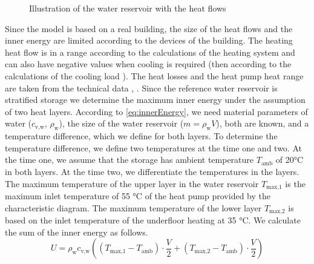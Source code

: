     \begin{figure}[H]
        \centering
        \def\svgwidth{120pt}
        
        \caption{Illustration of the water reservoir with the heat flows}
        \label{fig:Figure of the water reservoir with the heat flows}
    \end{figure}
    Since the model is based on a real building, the size of the heat flows and the inner energy are limited according to the devices of the building. The heating heat flow is in a range according to the calculations of the heating system \cite{Roth_Auslegung.2020} and can also have negative values when cooling is required (then according to the calculations of the cooling load \cite{SEFIngenieurgesellschaftMBH.2019}). The heat losses and the heat pump heat range are taken from the technical data \cite{Oskar}, \cite{TUM}.\newline
    Since the reference water reservoir is stratified storage we determine the maximum inner energy under the assumption of two heat layers. According to \autoref{eq:innerEnergy}, we need material parameters of water ($c_\text{v,w}$, $\rho_\text{w}$), the size of the water reservoir ($m = \rho_\text{w} V$), both are known, and a temperature difference, which we define for both layers. To determine the temperature difference, we define two temperatures at the time one and two. At the time one, we assume that the storage has ambient temperature $T_\text{amb}$ of 20°C in both layers. At the time two, we differentiate the temperatures in the layers. The maximum temperature of the upper layer in the water reservoir $T_\text{max,1}$ is the maximum inlet temperature of 55 °C of the heat pump provided by the characteristic diagram. The maximum temperature of the lower layer $T_\text{max,2}$ is based on the inlet temperature of the underfloor heating at 35 °C. We calculate the sum of the inner energy as follows.
    \begin{equation}
        \label{eq:max.Energie}
        U = \rho_\text{w} c_\text{v,w} ((T_\text{max,1}-T_\text{amb})\cdot \frac{V}{2} + (T_\text{max,2}-T_\text{amb})\cdot \frac{V}{2}) 
    \end{equation}

